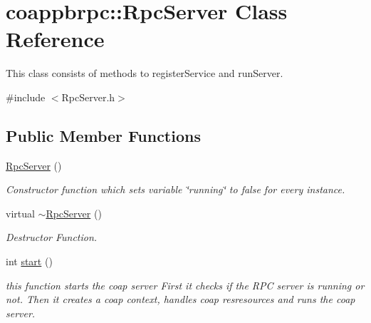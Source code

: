 \hypertarget{classcoappbrpc_1_1RpcServer}{}\section{coappbrpc\+:\+:Rpc\+Server Class Reference}
\label{classcoappbrpc_1_1RpcServer}


This class consists of methods to register\+Service and run\+Server.  




{\ttfamily \#include $<$Rpc\+Server.\+h$>$}

\subsection*{Public Member Functions}
\begin{DoxyCompactItemize}
\item 
\mbox{\label{classcoappbrpc_1_1RpcServer_af204829e600b25eebbe1b2f25998bf3a}} 
\hyperlink{classcoappbrpc_1_1RpcServer_af204829e600b25eebbe1b2f25998bf3a}{Rpc\+Server} ()
\begin{DoxyCompactList}\small\item\em Constructor function which sets variable \char`\"{}running\char`\"{} to false for every instance. \end{DoxyCompactList}\item 
\mbox{\label{classcoappbrpc_1_1RpcServer_a6fdde51aa522ed81525990fe2d969380}} 
virtual \hyperlink{classcoappbrpc_1_1RpcServer_a6fdde51aa522ed81525990fe2d969380}{$\sim$\+Rpc\+Server} ()
\begin{DoxyCompactList}\small\item\em Destructor Function. \end{DoxyCompactList}\item 
\mbox{\label{classcoappbrpc_1_1RpcServer_a7658f607ecc19f8c05082363ffd5cd54}} 
int \hyperlink{classcoappbrpc_1_1RpcServer_a7658f607ecc19f8c05082363ffd5cd54}{start} ()
\begin{DoxyCompactList}\small\item\em this function starts the coap server First it checks if the R\+PC server is running or not. Then it creates a coap context, handles coap resresources and runs the coap server. \end{DoxyCompactList}\item 

\end{DoxyCompactItemize}

